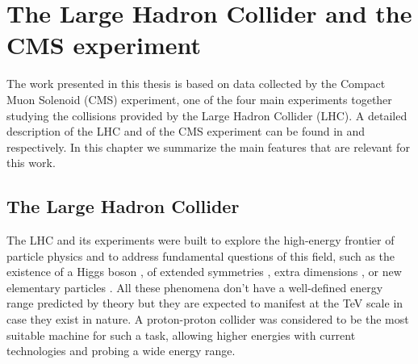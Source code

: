 \chapter{The Large Hadron Collider and the CMS experiment}
\label{sec:chap_2}

The work presented in this thesis is based on data collected by the Compact Muon Solenoid (CMS) experiment, 
one of the four main experiments together studying the collisions 
provided by the Large Hadron Collider (LHC). A detailed description of the LHC and of the CMS 
experiment can be found in \cite{Evans:2006tq} and \cite{Chatrchyan:2008aa} respectively.
In this chapter we summarize the main features that are relevant for this work.

\section{The Large Hadron Collider}

The LHC and its experiments were built to explore the high-energy frontier of particle physics and to address fundamental questions of this field, such as the existence of a Higgs boson \cite{Englert:1964et,Higgs:1964ia,Higgs:1964pj,Guralnik:1964eu,Higgs:1966ev,Kibble:1967sv}, of extended symmetries \cite{Martin:1997ns}, extra dimensions \cite{Antoniadis:1999bq}, or new elementary particles \cite{Beltran:2010ww,Randall:1999vf}. All these phenomena don't have a well-defined energy range predicted by theory but they are expected to manifest at the TeV scale in case they exist in nature. A proton-proton collider was considered to be the most suitable machine for such a task, allowing higher energies with current technologies and probing a wide energy range.%


